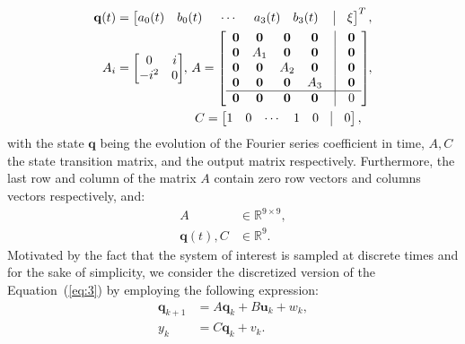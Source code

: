 \documentclass[letterpaper,10pt,conference]{ieeeconf}
\begin{document}
\begin{equation}\begin{split}
  \mathbf{q}(t)&=\begin{bmatrix}
    a_0(t) & b_0(t) & \hspace{1.1ex}\cdots\hspace{1.1ex} & a_3(t) & b_3(t) & \hspace{.6ex}\vline & \xi
  \end{bmatrix}^T,\\
  A_i&=\begin{bmatrix}0 & i \\ -i^2 & 0\end{bmatrix}\hspace{-.5ex},\,
  A=\left[\begin{array}{cccccc}
    \mathbf{0} & \mathbf{0} & \mathbf{0} & \mathbf{0} & \vline & \mathbf{0} \\
    \mathbf{0} & A_1 & \mathbf{0} & \mathbf{0} & \vline & \mathbf{0} \\
    \mathbf{0} & \mathbf{0} & A_2 & \mathbf{0} & \vline & \mathbf{0} \\
    \mathbf{0} & \mathbf{0} & \mathbf{0} & A_3 & \vline & \mathbf{0} \\ \hline
    \mathbf{0} & \mathbf{0} & \mathbf{0} & \mathbf{0} & \vline & 0
  \end{array}\right]\hspace{-.6ex},
  \\
  {}&\hspace{14.6ex}C=\begin{bmatrix}
    1 & 0 & \cdots & 1 & 0 & \vline & 0
  \end{bmatrix},\\
\end{split}\end{equation}
with the state $\mathbf{q}$ being the evolution of the Fourier series coefficient in time, $A, C$ the state transition matrix, and the output matrix respectively. Furthermore, the last row and column of the matrix $A$ contain zero row vectors and columns vectors respectively, and:
\begin{equation}\begin{split}
  A&\in\mathbb{R}^{9\times 9},\\
  \mathbf{q}(t), C&\in\mathbb{R}^9.
\end{split}\end{equation}
Motivated by the fact that the system of interest is sampled at discrete times and for the sake of simplicity, we consider the discretized version of the Equation~(\ref{eq:3}) by employing the following expression:
\begin{equation}\label{eq:6}\begin{split}
  \mathbf{q}_{k+1}&=A\mathbf{q}_{k}+B\mathbf{u}_{k}+w_k,\\
  y_k&=C\mathbf{q}_k+v_k.
\end{split}\end{equation}
\end{document}
